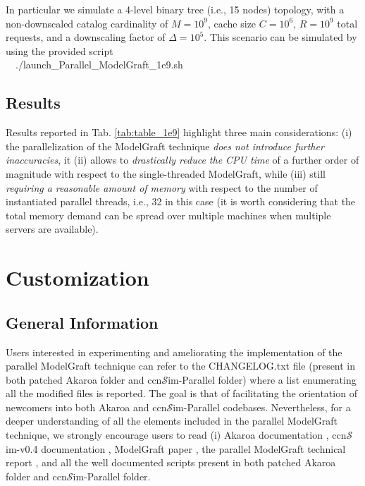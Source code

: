 \documentclass[10pt]{article}
\newcommand{\ccnsim}{ccn\ensuremath{\mathcal{S}}im} %
\newcommand{\colorboxg}[1]{{\colorbox{gray!20}{#1}}}
\begin{document}
In particular we simulate a 4-level binary tree (i.e., 15 nodes) topology, with a non-downscaled catalog cardinality of $M=10^9$, cache size $C=10^6$, $R=10^9$ total requests, and a downscaling factor of $\Delta=10^5$. This scenario can be simulated by using the provided script \\
\ \ \colorboxg{./launch\_Parallel\_ModelGraft\_1e9.sh} 


\subsection*{Results}
Results reported in Tab. \ref{tab:table_1e9} highlight three main considerations: (i) the parallelization of the ModelGraft technique \emph{does not introduce further inaccuracies}, it (ii) allows to \emph{drastically reduce the CPU time} of a further order of magnitude with respect to the single-threaded ModelGraft, while (iii) still \emph{requiring a reasonable amount of memory} with respect to the number of instantiated parallel threads, i.e., 32 in this case (it is worth considering that the total memory demand can be spread over multiple machines when multiple servers are available).   


\section*{Customization}

\subsection*{General Information} 
Users interested in experimenting and ameliorating the implementation of the parallel ModelGraft technique can refer to the CHANGELOG.txt file (present in both patched Akaroa folder and \ccnsim-Parallel folder) where a list enumerating all the modified files is reported. The goal is that of facilitating the orientation of newcomers into both Akaroa and \ccnsim-Parallel codebases. 
Nevertheless, for a deeper understanding of all the elements included in the parallel ModelGraft technique, we strongly encourage users to read (i) Akaroa documentation \cite{AkaroaPrj}, \ccnsim-v0.4 documentation \cite{ccnSim}, ModelGraft paper \cite{tortelli-comnet:17}, the parallel ModelGraft technical report \cite{pMG_techRep}, and all the well documented scripts present in both patched Akaroa folder and \ccnsim-Parallel folder.
\end{document}

